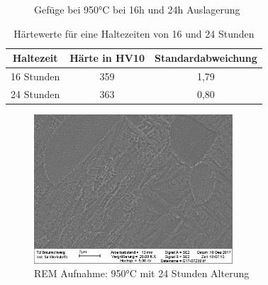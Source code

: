 \documentclass[a4paper, 11pt]{tubsreprt}
\begin{document}
\begin{figure}
	\caption{Gefüge bei 950°C bei 16h und 24h Auslagerung}
	\label{950 lange auslagerung}
\end{figure}

\begin{table}
\begin{tabular}{c|c|c}
Haltezeit & Härte in HV10	& Standardabweichung \\
\hline
16 Stunden & 359 & 1,79 \\
\hline
24 Stunden & 363 & 0,80 \\

\end{tabular}
\caption{Härtewerte für eine Haltezeiten von 16 und 24 Stunden}
\label{950 16 24}
\end{table}

\begin{figure}
\centering
\includegraphics[width=0.66\textwidth]{Bilder/REM950C1hWQ520C24hAC.png}
\caption{REM Aufnahme: 950°C mit 24 Stunden Alterung}
\label{REM 950C 24h}
\end{figure}
\end{document}
